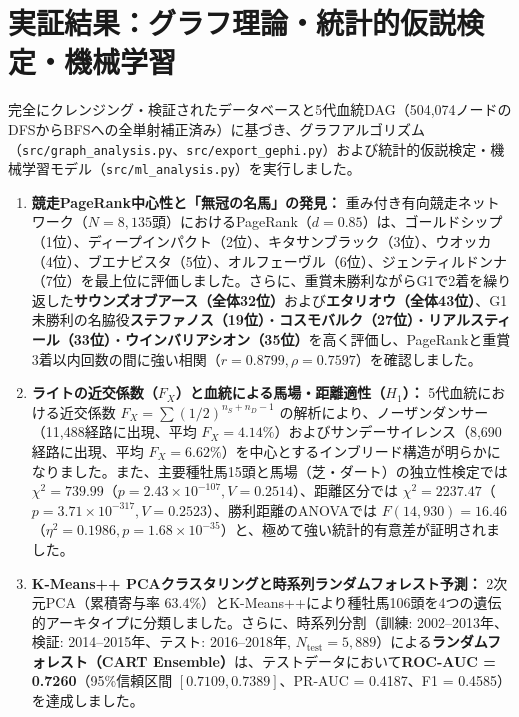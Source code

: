 \documentclass[12pt,a4paper]{article}
\begin{document}
\section{実証結果：グラフ理論・統計的仮説検定・機械学習}
完全にクレンジング・検証されたデータベースと5代血統DAG（504,074ノードのDFSからBFSへの全単射補正済み）に基づき、グラフアルゴリズム（\texttt{src/graph\_analysis.py}、\texttt{src/export\_gephi.py}）および統計的仮説検定・機械学習モデル（\texttt{src/ml\_analysis.py}）を実行しました。

\begin{enumerate}
    \item \textbf{競走PageRank中心性と「無冠の名馬」の発見：} 重み付き有向競走ネットワーク（$N = 8,135$頭）におけるPageRank（$d = 0.85$）は、ゴールドシップ（1位）、ディープインパクト（2位）、キタサンブラック（3位）、ウオッカ（4位）、ブエナビスタ（5位）、オルフェーヴル（6位）、ジェンティルドンナ（7位）を最上位に評価しました。さらに、重賞未勝利ながらG1で2着を繰り返した\textbf{サウンズオブアース（全体32位）}および\textbf{エタリオウ（全体43位）}、G1未勝利の名脇役\textbf{ステファノス（19位）}・\textbf{コスモバルク（27位）}・\textbf{リアルスティール（33位）}・\textbf{ウインバリアシオン（35位）}を高く評価し、PageRankと重賞3着以内回数の間に強い相関（$r = 0.8799, \rho = 0.7597$）を確認しました。
    \item \textbf{ライトの近交係数（$F_X$）と血統による馬場・距離適性（$H_1$）：} 5代血統における近交係数 $F_X = \sum (1/2)^{n_S + n_D - 1}$ の解析により、ノーザンダンサー（11,488経路に出現、平均 $F_X = 4.14\%$）およびサンデーサイレンス（8,690経路に出現、平均 $F_X = 6.62\%$）を中心とするインブリード構造が明らかになりました。また、主要種牡馬15頭と馬場（芝・ダート）の独立性検定では $\chi^2 = 739.99$（$p = 2.43 \times 10^{-107}, V = 0.2514$）、距離区分では $\chi^2 = 2237.47$（$p = 3.71 \times 10^{-317}, V = 0.2523$）、勝利距離のANOVAでは $F(14, 930) = 16.46$（$\eta^2 = 0.1986, p = 1.68 \times 10^{-35}$）と、極めて強い統計的有意差が証明されました。
    \item \textbf{K-Means++ PCAクラスタリングと時系列ランダムフォレスト予測：} 2次元PCA（累積寄与率 $63.4\%$）とK-Means++により種牡馬106頭を4つの遺伝的アーキタイプに分類しました。さらに、時系列分割（訓練: 2002--2013年、検証: 2014--2015年、テスト: 2016--2018年, $N_{\text{test}} = 5,889$）による\textbf{ランダムフォレスト（CART Ensemble）}は、テストデータにおいて\textbf{ROC-AUC = 0.7260}（95\%信頼区間 $[0.7109, 0.7389]$、PR-AUC = 0.4187、F1 = 0.4585）を達成しました。

\end{enumerate}
\end{document}
